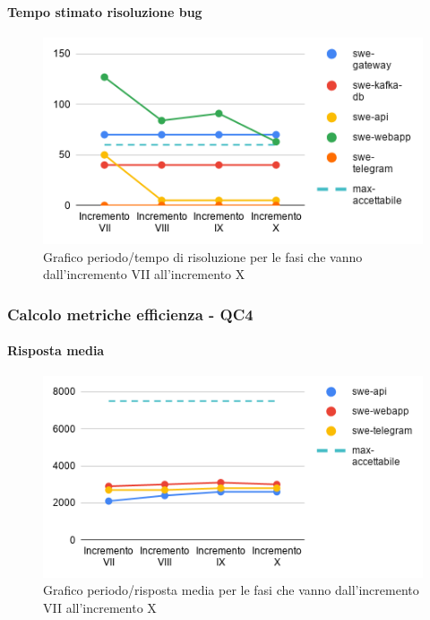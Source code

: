 \paragraph{Tempo stimato risoluzione bug}
\begin{figure}[H]
			\centering
			\includegraphics[width=0.8\linewidth]{./res/images/QM-PROD-7-TBUG.png}
			\caption{Grafico periodo/tempo di risoluzione per le fasi che vanno dall'incremento VII all'incremento X}
			\label{fig:Grafico periodo/tempo di risoluzione per le fasi che vanno dall'incremento VII all'incremento X}
	\end{figure}

\subsubsection{Calcolo metriche efficienza - QC4}
\paragraph{Risposta media}
\begin{figure}[H]
			\centering
			\includegraphics[width=0.8\linewidth]{./res/images/QM-PROD-8-RM.png}
			\caption{Grafico periodo/risposta media per le fasi che vanno dall'incremento VII all'incremento X}
			\label{fig:Grafico periodo/risposta media per le fasi che vanno dall'incremento VII all'incremento X}
	\end{figure}

